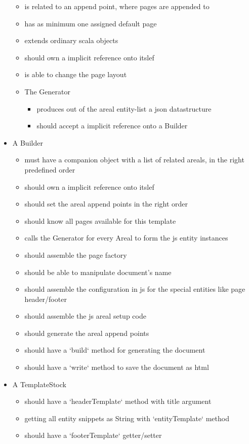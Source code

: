 \begin{itemize}
\begin{itemize}
    \item is related to an append point, where pages are appended to
    \item has as minimum one assigned default page
    \item extends ordinary scala objects
    \item should own a implicit reference onto itslef
    \item is able to change the page layout
    \item The Generator 
    \begin{itemize}
      \item produces out of the areal entity-list a json datastructure
      \item should accept a implicit reference onto a Builder
    \end{itemize}
  \end{itemize}
  \item A Builder 
  \begin{itemize}
    \item must have a companion object with a list of related areals, in the right predefined order
    \item should own a implicit reference onto itslef
    \item should set the areal append points in the right order
    \item should know all pages available for this template
    \item calls the Generator for every Areal to form the js entity instances
    \item should assemble the page factory
    \item should be able to manipulate document's name
    \item should assemble the configuration in js for the special entities like page header/footer
    \item should assemble the js areal setup code
    \item should generate the areal append points
    \item should have a `build` method for generating the document
    \item should have a `write` method to save the document as html
  \end{itemize}
  \item A TemplateStock
  \begin{itemize}
    \item should have a `headerTemplate` method with title argument
    \item getting all entity snippets as String with `entityTemplate` method
    \item should have a `footerTemplate` getter/setter
  \end{itemize}
\end{itemize}

